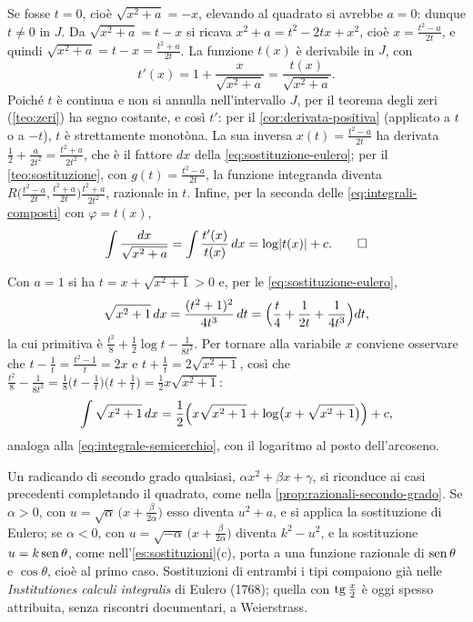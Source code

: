 \begin{dimostrazione}
Se fosse $t=0$, cioè $\sqrt{x^{2}+a}=-x$, elevando al quadrato si avrebbe $a=0$: dunque
$t\neq0$ in $J$. Da $\sqrt{x^{2}+a}=t-x$ si ricava $x^{2}+a=t^{2}-2tx+x^{2}$, cioè
$x=\frac{t^{2}-a}{2t}$, e quindi $\sqrt{x^{2}+a}=t-x=\frac{t^{2}+a}{2t}$. La funzione $t(x)$ è
derivabile in $J$, con
\[
  t'(x)=1+\frac x{\sqrt{x^{2}+a}}=\frac{t(x)}{\sqrt{x^{2}+a}} .
\]
Poiché $t$ è continua e non si annulla nell'intervallo $J$, per il teorema degli zeri
(\cref{teo:zeri}) ha segno costante, e così $t'$: per il \cref{cor:derivata-positiva}
(applicato a $t$ o a $-t$), $t$ è strettamente monotòna. La sua inversa
$x(t)=\frac{t^{2}-a}{2t}$ ha derivata $\frac12+\frac a{2t^{2}}=\frac{t^{2}+a}{2t^{2}}$, che è il
fattore $dx$ della \eqref{eq:sostituzione-eulero}; per il \cref{teo:sostituzione}, con
$g(t)=\frac{t^{2}-a}{2t}$, la funzione integranda diventa
$R\bigl(\frac{t^{2}-a}{2t},\frac{t^{2}+a}{2t}\bigr)\frac{t^{2}+a}{2t^{2}}$, razionale in $t$.
Infine, per la seconda delle \eqref{eq:integrali-composti} con $\varphi=t(x)$,
\[
  \int\frac{dx}{\sqrt{x^{2}+a}}=\int\frac{t'(x)}{t(x)}\,dx=\log\lvert t(x)\rvert+c . \qedhere
\]
\end{dimostrazione}

\begin{esempio}\label{es:radice-x2-piu-1}
Con $a=1$ si ha $t=x+\sqrt{x^{2}+1}>0$ e, per le \eqref{eq:sostituzione-eulero},
\[
  \sqrt{x^{2}+1}\,dx=\frac{(t^{2}+1)^{2}}{4t^{3}}\,dt
  =\Bigl(\frac t4+\frac1{2t}+\frac1{4t^{3}}\Bigr)dt ,
\]
la cui primitiva è $\frac{t^{2}}8+\frac12\log t-\frac1{8t^{2}}$. Per tornare alla variabile
$x$ conviene osservare che $t-\frac1t=\frac{t^{2}-1}t=2x$ e $t+\frac1t=2\sqrt{x^{2}+1}$, così che
$\frac{t^{2}}8-\frac1{8t^{2}}=\frac18\bigl(t-\frac1t\bigr)\bigl(t+\frac1t\bigr)=\frac12x\sqrt{x^{2}+1}$:
\[
  \int\sqrt{x^{2}+1}\,dx=\frac12\Bigl(x\sqrt{x^{2}+1}+\log\bigl(x+\sqrt{x^{2}+1}\bigr)\Bigr)+c ,
\]
analoga alla \eqref{eq:integrale-semicerchio}, con il logaritmo al posto
dell'arcoseno.
\end{esempio}

Un radicando di secondo grado qualsiasi, $\alpha x^{2}+\beta x+\gamma$, si riconduce ai
casi precedenti completando il quadrato, come nella \cref{prop:razionali-secondo-grado}.
Se $\alpha>0$, con $u=\sqrt\alpha\,\bigl(x+\frac\beta{2\alpha}\bigr)$ esso diventa $u^{2}+a$, e si
applica la sostituzione di Eulero; se $\alpha<0$, con $u=\sqrt{-\alpha}\,\bigl(x+\frac\beta{2\alpha}\bigr)$
diventa $k^{2}-u^{2}$, e la sostituzione $u=k\operatorname{sen}\theta$, come nell'\cref{es:sostituzioni}(c),
porta a una funzione razionale di $\operatorname{sen}\theta$ e $\cos\theta$, cioè al primo caso. Sostituzioni di entrambi i tipi compaiono
già nelle \emph{Institutiones calculi integralis} di Eulero (1768); quella con
$\operatorname{tg}\frac x2$ è oggi spesso attribuita, senza riscontri documentari, a Weierstrass.

